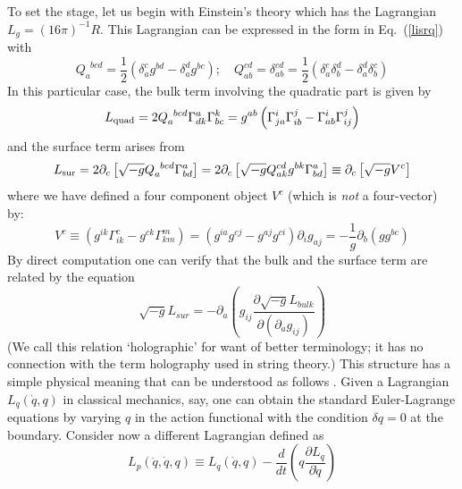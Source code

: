 \documentclass[12pt]{iopart}
\def\eq#1{{Eq.~(\ref{#1})}}
\begin{document}
To set the stage, let us begin with Einstein's theory which has the Lagrangian  $L_g=(16\pi)^{-1} R$. This Lagrangian 
can be expressed in the form in \eq{lisrq}
with
\begin{equation}
 Q_a^{\phantom{a}bcd}=\frac{1}{2}(\delta^c_ag^{bd}-\delta^d_ag^{bc});\quad
 Q^{cd}_{ab}=\delta_{ab}^{cd}=\frac{1}{2}(\delta^c_a\delta_b^{d}-\delta^d_a\delta_b^{c})
 \label{altq}
\end{equation} 
In this particular case, the bulk term involving the quadratic part is given by
\begin{equation}
L_{\rm quad}=2Q_a^{\phantom{a}bcd}\Gamma^a_{dk}\Gamma^k_{bc}
=g^{ab} \left(\Gamma^i_{ja} \Gamma^j_{ib} -\Gamma^i_{ab} \Gamma^j_{ij}\right)
\label{quadpart}
\end{equation}
and  the surface term arises from 
\begin{equation}
L_{\rm sur}=2\partial_c\left[\sqrt{-g}Q_a^{\phantom{a}bcd}\Gamma^a_{bd}\right]
=2\partial_c\left[\sqrt{-g}Q_{ak}^{cd}g^{bk}\Gamma^a_{bd}\right]
\equiv\partial_c\left[\sqrt{-g}V^c\right]
\label{surpart}
\end{equation} 
where we have defined a four component object $V^c$ (which is \textit{not} a four-vector) by:
\begin{equation}
 V^c \equiv \left(g^{ik} \Gamma^c_{ik}-g^{ck} \Gamma^m_{km}\right) 
 = (g^{ia} g^{cj}-g^{aj} g^{ci})\partial_ig_{aj}
 =-\frac{1}{g} \partial_b (g g^{bc})
    \label{defpcone}
     \end{equation}
By direct computation one can verify that the bulk and the surface term are related by the equation 
\begin{equation}
    \sqrt{-g}L_{sur}=-\partial_a\left(g_{ij}
\frac{\partial \sqrt{-g}L_{bulk}}{\partial(\partial_ag_{ij})}\right)
\label{pecurrel}
\end{equation}
(We call this relation `holographic' for want of better terminology; it has no connection with the term holography used in string theory.)
This structure has a simple physical meaning that  can be understood as follows \cite{TPhol002,TPgravquantum}.
Given a Lagrangian $L_q(\dot q, q)$ in classical mechanics, say,  one can obtain the standard Euler-Lagrange equations
by varying $q$ in the action functional with the  condition $\delta q =0 $ at the boundary.
Consider now a different Lagrangian defined as 
\begin{equation}
L_p (\ddot q, \dot q, q) \equiv L_q(\dot q, q) - \frac{d}{dt} \left( q \frac{\partial L_q}{\partial \dot q}\right) 
\label{lp}
\end{equation} 
\end{document}
